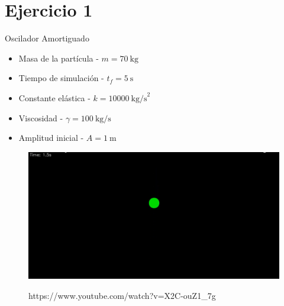 \section{Ejercicio 1}\label{sec:ejercicio1}

\begin{frame}{Oscilador Amortiguado}
    \begin{multicols}{2}
        {
        \begin{itemize}
            \item Masa de la partícula - $m = 70\ \text{kg}$
            \item Tiempo de simulación - $t_f = 5\ \text{s}$
            \item Constante elástica - $k = 10000\ \text{kg/s}^2$
            \item Viscosidad - $\gamma = 100\ \text{kg/s}$
            \item Amplitud inicial - $A = 1\ \text{m}$
        \end{itemize}
        }
        {
        \begin{figure}[H]
            \centering
            \includegraphics[width=1\linewidth]{pic/00-ejercicio1/thumbnail.png}\\
            \captionsetup{labelformat=empty}
            \caption{https://www.youtube.com/watch?v=X2C-ouZ1_7g}
        \end{figure}
        }
    \end{multicols}
\end{frame}


